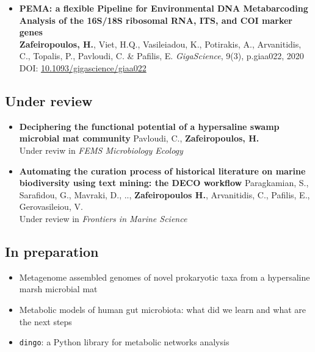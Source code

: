 \begin{itemize}
      \item{
         \textbf{PEMA: a flexible Pipeline for Environmental DNA Metabarcoding Analysis of the 16S/18S ribosomal RNA, ITS, and COI marker genes} \\ 
         \textbf{Zafeiropoulos, H.}, Viet, H.Q., Vasileiadou, K., Potirakis, A., Arvanitidis, C., Topalis, P., Pavloudi, C. \& Pafilis, E. \textit{GigaScience}, 9(3), p.giaa022, 2020
         DOI: \href{https://doi.org/10.1093/gigascience/giaa022}{10.1093/gigascience/giaa022}
      }

   \end{itemize}


\subsection*{Under review}

   \begin{itemize}
      \item {
         \textbf{Deciphering the functional potential of a hypersaline swamp microbial mat community}
         Pavloudi, C., \textbf{Zafeiropoulos, H.} \\
         Under reviw in \textit{FEMS Microbiology Ecology}
         }
      \item {
         \textbf{Automating the curation process of historical literature on marine biodiversity using text mining: the DECO workflow}
         }
         Paragkamian, S., Sarafidou, G., Mavraki, D., .., \textbf{Zafeiropoulos H.}, Arvanitidis, C., Pafilis, E., Gerovasileiou, V. \\
         Under review in \textit{Frontiers in Marine Science}
   \end{itemize}


\subsection*{In preparation}

   \begin{itemize}
      \item Metagenome assembled genomes of novel prokaryotic taxa from a hypersaline marsh microbial mat
      \item Metabolic models of human gut microbiota: what did we learn and what are the next steps
      \item \texttt{dingo}: a Python library for metabolic networks analysis 
   \end{itemize}





